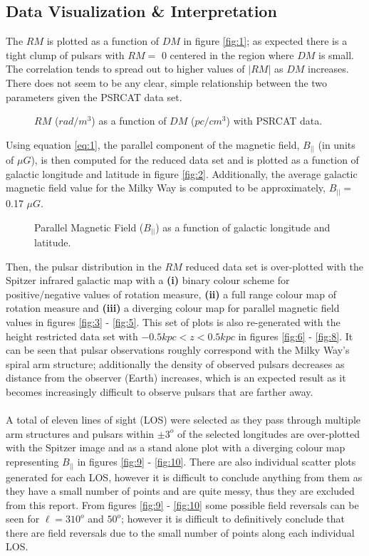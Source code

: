 \documentclass[12pt]{article}
\begin{document}
\subsection{Data Visualization \& Interpretation}
    The $RM$ is plotted as a function of $DM$ in figure \eqref{fig:1}; as expected there is a tight clump of pulsars with $RM =$ 0 centered in the region where $DM$ is small. The correlation tends to spread out to higher values of $|RM|$ as $DM$ increases. There does not seem to be any clear, simple relationship between the two parameters given the PSRCAT data set.
    \begin{figure}[!htb]
        \caption{\label{fig:1} $RM$ ($rad/m^{3}$) as a function of $DM$ ($pc/cm^{3}$) with PSRCAT data.}
    \end{figure}
    Using equation \eqref{eq:1}, the parallel component of the magnetic field, $B_{||}$ (in units of $\mu G$), is then computed for the reduced data set and is plotted as a function of galactic longitude and latitude in figure \eqref{fig:2}. Additionally, the average galactic magnetic field value for the Milky Way is computed to be approximately, $B_{||} =$ 0.17 $\mu G$.
    \begin{figure}[!htb]
        \caption{\label{fig:2} Parallel Magnetic Field ($B_{||}$) as a function of galactic longitude and latitude.}
    \end{figure}
    Then, the pulsar distribution in the $RM$ reduced data set is over-plotted with the Spitzer infrared galactic map with a \textbf{(i)} binary colour scheme for positive/negative values of rotation measure, \textbf{(ii)} a full range colour map of rotation measure and \textbf{(iii)} a diverging colour map for parallel magnetic field values in figures \eqref{fig:3} - \eqref{fig:5}. This set of plots is also re-generated with the height restricted data set with $-0.5 kpc < z < 0.5 kpc$ in figures \eqref{fig:6} - \eqref{fig:8}. It can be seen that pulsar observations roughly correspond with the Milky Way's spiral arm structure; additionally the density of observed pulsars decreases as distance from the observer (Earth) increases, which is an expected result as it becomes increasingly difficult to observe pulsars that are farther away.
    \\
    \\
    A total of eleven lines of sight (LOS) were selected as they pass through multiple arm structures and pulsars within $\pm 3^{o}$ of the selected longitudes are over-plotted with the Spitzer image and as a stand alone plot with a diverging colour map representing $B_{||}$ in figures \eqref{fig:9} - \eqref{fig:10}. There are also individual scatter plots generated for each LOS, however it is difficult to conclude anything from them as they have a small number of points and are quite messy, thus they are excluded from this report. From figures \eqref{fig:9} - \eqref{fig:10} some possible field reversals can be seen for $\ell = 310^{o}$ and $50^{o}$; however it is difficult to definitively conclude that there are field reversals due to the small number of points along each individual LOS.
\end{document}
